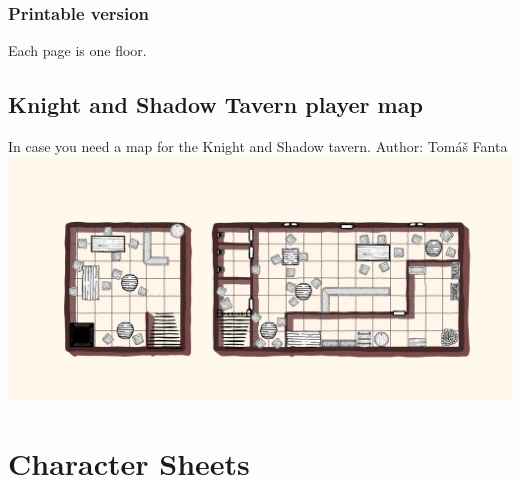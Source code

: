 \documentclass[10pt,onecolumn,twoside,openany,bg=full,layout=true]{dndbook}
\begin{document}
\subsection* {Printable version}
Each page is one floor.



\section{Knight and Shadow Tavern player map}\label{sec:knight-and-shadow-tavern}
In case you need a map for the Knight and Shadow tavern.
Author: Tomáš Fanta
\includegraphics[width=1\textwidth]{img/maps/knight_and_shadow_tavern}

\vfill
\newpage
\chapter{Character Sheets}\label{ch:charactersheets}
\end{document}
